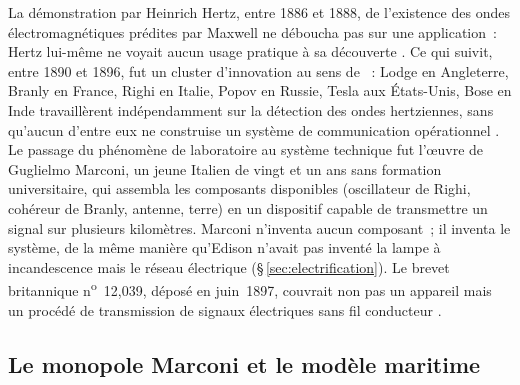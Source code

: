%
La démonstration par Heinrich Hertz, entre 1886 et 1888, de l'existence des ondes électromagnétiques prédites par Maxwell ne déboucha pas sur une application~: Hertz lui-même ne voyait aucun usage pratique à sa découverte \parencite{jolly_marconi_1972}. Ce qui suivit, entre 1890 et 1896, fut un cluster d'innovation au sens de \textcite{kooij_information_2022}~: Lodge en Angleterre, Branly en France, Righi en Italie, Popov en Russie, Tesla aux États-Unis, Bose en Inde travaillèrent indépendamment sur la détection des ondes hertziennes, sans qu'aucun d'entre eux ne construise un système de communication opérationnel \parencite{jolly_marconi_1972, raboy_marconi_2016}. Le passage du phénomène de laboratoire au système technique fut l'œuvre de Guglielmo Marconi, un jeune Italien de vingt et un ans sans formation universitaire, qui assembla les composants disponibles (oscillateur de Righi, cohéreur de Branly, antenne, terre) en un dispositif capable de transmettre un signal sur plusieurs kilomètres. Marconi n'inventa aucun composant~; il inventa le système, de la même manière qu'Edison n'avait pas inventé la lampe à incandescence mais le réseau électrique (§\,\ref{sec:electrification}). Le brevet britannique n\textsuperscript{o}~12,039, déposé en juin~1897, couvrait non pas un appareil mais un procédé de transmission de signaux électriques sans fil conducteur \parencite{jolly_marconi_1972}.


\subsection{Le monopole Marconi et le modèle maritime}\label{subsec:marconi}

